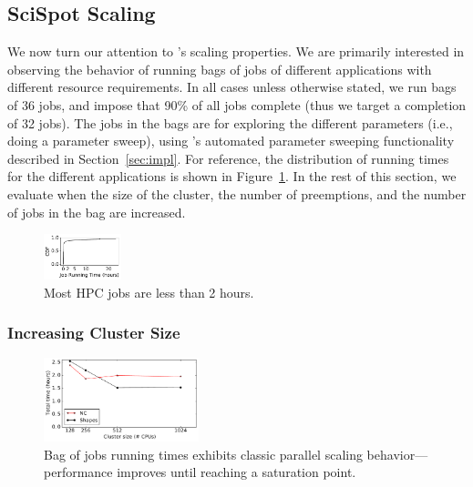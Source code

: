 
\subsection{SciSpot Scaling}
We now turn our attention to \sysname's scaling properties. We are primarily interested in observing the behavior of running bags of jobs of different applications with different resource requirements.
In all cases unless otherwise stated, we run bags of 36 jobs, and impose that 90\% of all jobs complete (thus we target a completion of 32 jobs).
The jobs in the bags are for exploring the different parameters (i.e., doing a parameter sweep), using \sysname's automated parameter sweeping functionality described in Section~\ref{sec:impl}. For reference, the distribution of running times for the different applications is shown in Figure~\ref{fig:job-run-cdf}. 
In the rest of this section, we evaluate \sysname when the size of the cluster, the number of preemptions, and the number of jobs in the bag are increased.

\begin{figure}
  \includegraphics[width=0.2\textwidth]{../graphs/job-run-cdf.pdf}
  \vspace*{\myfigspace}
  \caption{Most HPC jobs are less than 2 hours.}
  \label{fig:job-run-cdf}
    \vspace*{\myfigspace}
\end{figure}

\subsubsection{Increasing Cluster Size} 

\begin{figure}
  \includegraphics[width=0.4\textwidth]{../graphs/vm-per-job-scaling.pdf}
      \vspace*{\myfigspace}
  \caption{Bag of jobs running times exhibits classic parallel scaling behavior---performance improves until reaching a saturation point.}
  \label{fig:vm-per-job-scaling}
    \vspace*{\myfigspace}
\end{figure}

